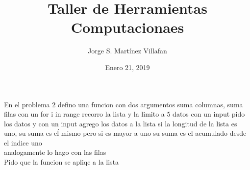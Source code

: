 \documentclass[letterpaper, 12pt, oneside]{article}%
\title{\Huge Taller de Herramientas Computacionaes}
\author{Jorge S. Martínez Villafan}
\date{Enero 21, 2019}
\begin{document}
En el problema 2 defino una funcion con dos argumentos suma columnas, suma filas con un for i in range recorro la lista y la limito a 5 datos con un input pido los datos y con un input agrego los datos a la lista si la longitud de la lista es uno, su suma es eĺ mismo
pero si es mayor a uno su suma es el acumulado desde el indice uno \\analogamente lo hago con las filas
\\Pido que la funcion se apliqe a la lista 
\end{document}
